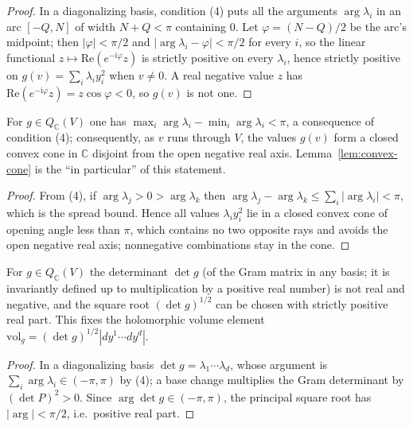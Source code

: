 \begin{proof}
  \leanok
  In a diagonalizing basis, condition (4) puts all the arguments
  $\arg \lambda_i$ in an arc $[-Q, N]$ of width $N + Q < \pi$ containing
  $0$. Let $\varphi = (N - Q)/2$ be the arc's midpoint; then
  $|\varphi| < \pi/2$ and $|\arg \lambda_i - \varphi| < \pi/2$ for every
  $i$, so the linear functional $z \mapsto \mathrm{Re}(e^{-\mathrm i \varphi} z)$
  is strictly positive on every $\lambda_i$, hence strictly positive on
  $g(v) = \sum_i \lambda_i y_i^2$ when $v \neq 0$. A real negative value
  $z$ has $\mathrm{Re}(e^{-\mathrm i \varphi} z) = z \cos \varphi < 0$, so
  $g(v)$ is not one.
\end{proof}

\begin{lemma}
  \label{lem:convex-cone-geometry}
  \notready
  For $g \in Q_{\mathbb C}(V)$ one has
  $\max_i \arg \lambda_i - \min_i \arg \lambda_i < \pi$, a consequence of
  condition (4); consequently, as $v$ runs through $V$, the values $g(v)$
  form a closed convex cone in $\mathbb C$ disjoint from the open negative
  real axis. Lemma~\ref{lem:convex-cone} is the ``in particular'' of this
  statement.
\end{lemma}

\begin{proof}
  From (4), if $\arg \lambda_j > 0 > \arg \lambda_k$ then
  $\arg \lambda_j - \arg \lambda_k \leq \sum_i |\arg \lambda_i| < \pi$,
  which is the spread bound. Hence all values $\lambda_i y_i^2$ lie in a
  closed convex cone of opening angle less than $\pi$, which contains no
  two opposite rays and avoids the open negative real axis; nonnegative
  combinations stay in the cone.
\end{proof}

\begin{lemma}
  \label{lem:volume-element}
  \leanok
  For $g \in Q_{\mathbb C}(V)$ the determinant $\det g$ (of the Gram matrix
  in any basis; it is invariantly defined up to multiplication by a positive
  real number) is not real and negative, and the square root
  $(\det g)^{1/2}$ can be chosen with strictly positive real part. This
  fixes the holomorphic volume element
  $\mathrm{vol}_g = (\det g)^{1/2} |dy^1 \cdots dy^d|$.
\end{lemma}

\begin{proof}
  \leanok
  In a diagonalizing basis $\det g = \lambda_1 \cdots \lambda_d$, whose
  argument is $\sum_i \arg \lambda_i \in (-\pi, \pi)$ by (4); a base change
  multiplies the Gram determinant by $(\det P)^2 > 0$. Since
  $\arg \det g \in (-\pi,\pi)$, the principal square root has
  $|\arg| < \pi/2$, i.e.\ positive real part.
\end{proof}


